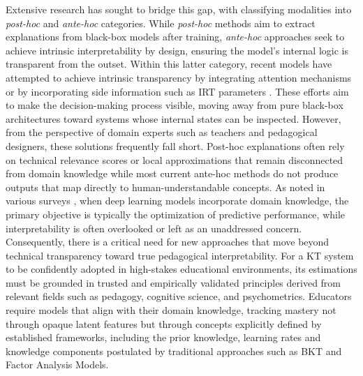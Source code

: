 \documentclass[applsci,article,submit,moreauthors,pdftex]{Definitions/mdpi}
\begin{document}
{Extensive research has sought to bridge this gap, with \citet{bai2024survey} classifying modalities into \textit{post-hoc} and \textit{ante-hoc} categories. While \textit{post-hoc} methods aim to extract explanations from black-box models after training, \textit{ante-hoc} approaches seek to achieve intrinsic interpretability by design, ensuring the model's internal logic is transparent from the outset. Within this latter category, recent models have attempted to achieve intrinsic transparency by integrating attention mechanisms \citep{Pandey2019384, ghosh2020context} or by incorporating side information such as IRT parameters \citep{yeung2019deep, su2021time, chen2023improving}. These efforts aim to make the decision-making process visible, moving away from pure black-box architectures toward systems whose internal states can be inspected.
However, from the perspective of domain experts such as teachers and pedagogical designers, these solutions frequently fall short. Post-hoc explanations often rely on technical relevance scores or local approximations that remain disconnected from domain knowledge \citep{rudin2019stop} while most current ante-hoc methods do not produce outputs that map directly to human-understandable concepts. As noted in various surveys \citep{bai2024survey, vonrueden2021informed}, when deep learning models incorporate domain knowledge, the primary objective is typically the optimization of predictive performance, while interpretability is often overlooked or left as an unaddressed concern.
Consequently, there is a critical need for new approaches that move beyond technical transparency toward true pedagogical interpretability. For a KT system to be confidently adopted in high-stakes educational environments, its estimations must be grounded in trusted and empirically validated principles derived from relevant fields such as pedagogy, cognitive science, and psychometrics. Educators require models that align with their domain knowledge, tracking mastery not through opaque latent features but through concepts explicitly defined by established frameworks, including the prior knowledge, learning rates and knowledge components postulated by traditional approaches such as BKT and Factor Analysis Models.}
\end{document}
